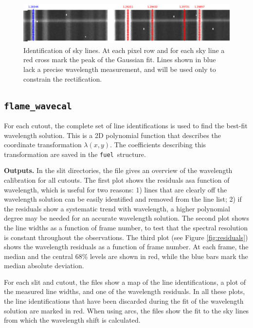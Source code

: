 \documentclass[a4paper]{article}
\newcommand{\fuel}{\texttt{fuel}}
\begin{document}
\begin{sloppypar}
\begin{figure}[tbp]
\centering
\includegraphics[width=\textwidth]{speclines.png}
\caption{Identification of sky lines. At each pixel row and for each sky line a red cross mark the peak of the Gaussian fit. Lines shown in blue lack a precise wavelength measurement, and will be used only to constrain the rectification.}
\label{fig:speclines}
\end{figure}


\subsection{\texttt{flame\_wavecal}}
\label{sec:wavecal}

For each cutout, the complete set of line identifications is used to find the best-fit wavelength solution. This is a 2D polynomial function that describes the coordinate transformation $\lambda(x,y)$. The coefficients describing this transformation are saved in the \fuel\ structure.

\medskip
\noindent
\textbf{Outputs.} In the slit directories, the file  gives an overview of the wavelength calibration for all cutouts. The first plot shows the residuals asa function of wavelength, which is useful for two reasons: 1) lines that are clearly off the wavelength solution can be easily identified and removed from the line list; 2) if the residuals show a systematic trend with wavelength, a higher polynomial degree may be needed for an accurate wavelength solution. The second plot shows the line widths as a function of frame number, to test that the spectral resolution is constant throughout the observations. The third plot (see Figure \ref{fig:residuals}) shows the wavelength residuals as a function of frame number. At each frame, the median and the central 68\% levels are shown in red, while the blue bars mark the median absolute deviation.

For each slit and cutout, the  files show a map of the line identifications, a plot of the measured line widths, and one of the wavelength residuals. In all these plots, the line identifications that have been discarded during the fit of the wavelength solution are marked in red. When using arcs, the  files show the fit to the sky lines from which the wavelength shift is calculated.


\end{sloppypar}
\end{document}
